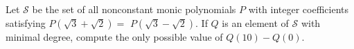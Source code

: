 Let $\mathcal{S}$ be the set of all nonconstant monic polynomials $P$ with integer coefficients satisfying $P(\sqrt{3}+\sqrt{2})=$ $P(\sqrt{3}-\sqrt{2})$. If $Q$ is an element of $\mathcal{S}$ with minimal degree, compute the only possible value of $Q(10)-Q(0)$.